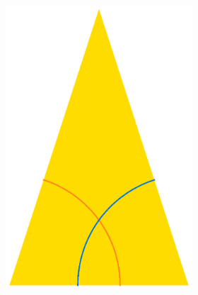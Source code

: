 \documentclass[
  oneside,
  11pt, a4paper,
  footinclude=true,
  headinclude=true,
  cleardoublepage=empty
]{scrbook}
\begin{document}
\begin{figure}[H]
        \begin{subfigure}[b]{\textwidth}
        \begin{subfigure}[b]{0.4\textwidth}
        \centering
		\includegraphics[scale=0.3]{RobinsonSkinny}
        \end{subfigure}\hfill \raisebox{30px}{\huge$\rightarrow$} \hfill
        \begin{subfigure}[b]{0.4\textwidth}
        \centering

\end{subfigure}
\end{subfigure}
\end{figure}
\end{document}

